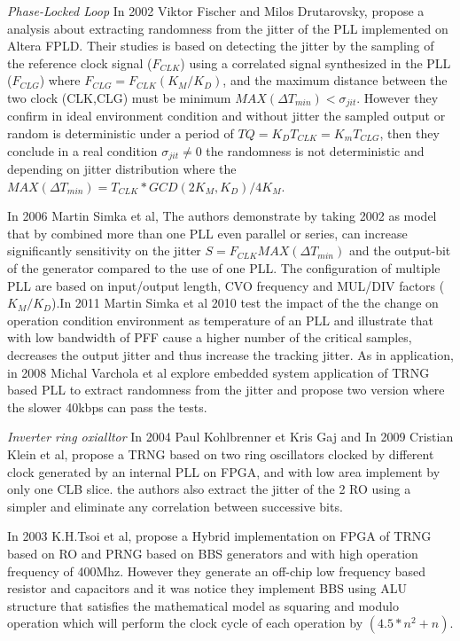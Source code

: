 \textit{Phase-Locked Loop} In 2002 Viktor Fischer and Milos Drutarovsky, propose a analysis about extracting randomness from the jitter of the PLL implemented on Altera FPLD. Their studies is based on detecting the jitter by the sampling of the reference clock signal ($F_{CLK}$) using a correlated signal synthesized in the PLL ($F_{CLG}$) where $F_{CLG}=F_{CLK}(K_{M}/K_{D})$, and the maximum distance between the two clock (CLK,CLG) must be minimum $MAX(\Delta T_{min}) < \sigma_{jit}$. However they confirm in ideal environment condition and without jitter the sampled output or random is deterministic under a period of $T{Q}={K_{D}T_{CLK}}={K_{m}T_{CLG}}$, then they conclude in a real condition $\sigma_{jit} \neq 0 $ the randomness is not deterministic and depending on jitter distribution where the $MAX(\Delta T_{min})= T_{CLK}*GCD(2K_{M},K_{D})/4K_{M}$.  

In 2006 Martin Simka et al, The authors demonstrate by taking 2002 as model that by combined more than one PLL even parallel or series, can increase significantly sensitivity on the jitter $S=F_{CLK}MAX(\Delta T_{min})$ and the output-bit of the generator compared to the use of one PLL. The configuration of multiple PLL are based on input/output length, CVO frequency and MUL/DIV factors ($K_{M}/K_{D}$).In 2011 Martin Simka et al 2010 test the impact of the the change on operation condition environment as temperature of an PLL and illustrate that with low bandwidth of PFF cause a higher number of the critical samples, decreases the output jitter and thus increase the tracking jitter. As in application, in 2008 Michal Varchola et al explore embedded system application of TRNG based PLL to extract randomness from the jitter and propose two version where the slower 40kbps can pass the tests.

\textit{Inverter ring oxialltor} In 2004 Paul Kohlbrenner et Kris Gaj and In 2009 Cristian Klein et al, propose a TRNG based on two ring oscillators clocked by different clock generated by an internal PLL on FPGA, and with low area implement by only one CLB slice. the authors also extract the jitter of the 2 RO using a simpler and eliminate any correlation between successive bits.

In 2003 K.H.Tsoi et al, propose a Hybrid implementation on FPGA of TRNG based on RO and PRNG based on BBS generators and with high operation frequency of 400Mhz. However they generate an off-chip low frequency based resistor and capacitors and it was notice they implement BBS using ALU structure that satisfies the mathematical model as squaring and modulo operation which will perform the clock cycle of each operation by $(4.5*n^{2} + n)$.

